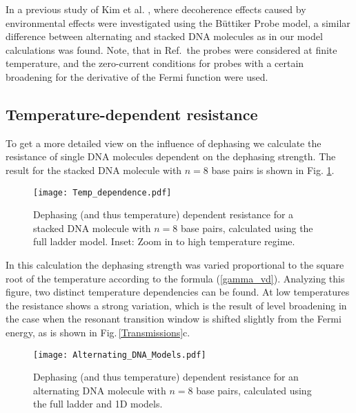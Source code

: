 \documentclass[reprint,superscriptaddress,nofootinbib,amsmath,amssymb,prb,floatfix]{revtex4-1}
\begin{document}
In a previous study of Kim et al. \cite{kim_intermediate_2016}, where decoherence effects caused by
environmental effects were investigated using the B\"uttiker Probe model, a similar difference
between alternating and stacked DNA molecules as in our model calculations was found. Note, that in
Ref.\, the probes were considered at finite temperature, and the
zero-current conditions for probes with a certain broadening for the derivative of the Fermi
function were used.

\subsection{Temperature-dependent resistance}

To get a more detailed view on the influence of dephasing we calculate the resistance of single DNA
molecules dependent on the dephasing strength. The result for the stacked DNA molecule with $n = 8$
base pairs is shown in Fig. \ref{Temp_Dependence}.

\begin{figure}[t]
  \texttt{[image: Temp\_dependence.pdf]}
  \caption{Dephasing (and thus temperature) dependent resistance for a stacked DNA molecule with $n = 8$ base pairs, calculated using the full ladder model. Inset: Zoom in to high temperature regime.}
  \label{Temp_Dependence}
\end{figure}

In this calculation the dephasing strength was varied proportional to the square root of the
temperature according to the formula (\ref{gamma_vd}).  Analyzing this figure, two distinct
temperature dependencies can be found. At low temperatures the resistance shows a strong variation,
which is the result of level broadening in the case when the resonant transition window is shifted
slightly from the Fermi energy, as is shown in Fig.\,\ref{Transmissions}c.

\begin{figure}[t]
  \texttt{[image: Alternating\_DNA\_Models.pdf]}
  \caption{Dephasing (and thus temperature) dependent resistance for an alternating DNA molecule with $n = 8$ base pairs, calculated using the full ladder and 1D models. }
  \label{Alternating_DNA_Models}
\end{figure}
\end{document}
